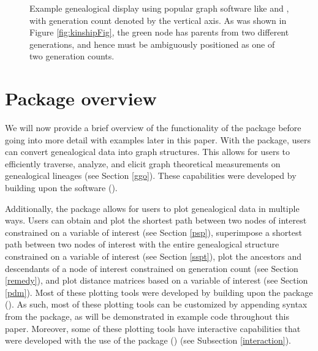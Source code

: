 \documentclass[article,shortnames]{jss}
\begin{document}
\begin{figure}[H]
    \centering
    \caption{Example genealogical display using popular graph software like  and , with generation count denoted by the vertical axis. As was shown in Figure \ref{fig:kinshipFig}, the green node has parents from two different generations, and hence must be ambiguously positioned as one of two generation counts.}
    \label{fig:Graph}
\end{figure}

\section{Package overview}

We will now provide a brief overview of the functionality of the  package before going into more detail with examples later in this paper. With the  package, users can convert genealogical data into graph structures. This allows for users to efficiently traverse, analyze, and elicit graph theoretical measurements on genealogical lineages (see Section \ref{ggo}). These capabilities were developed by building upon the  software (\citealt{igraph}).

Additionally, the  package allows for users to plot genealogical data in multiple ways. Users can obtain and plot the shortest path between two nodes of interest constrained on a variable of interest (see Section \ref{psp}), superimpose a shortest path between two nodes of interest with the entire genealogical structure constrained on a variable of interest (see Section \ref{sspt}), plot the ancestors and descendants of a node of interest constrained on generation count (see Section \ref{remedy}), and plot distance matrices based on a variable of interest (see Section \ref{pdm}). Most of these plotting tools were developed by building upon the  package (\citealt{ggplot2}). As such, most of these plotting tools can be customized by appending syntax from the  package, as will be demonstrated in example code throughout this paper. Moreover, some of these plotting tools have interactive capabilities that were developed with the use of the  package (\citealt{plotly}) (see Subsection \ref{interaction}).
\end{document}
